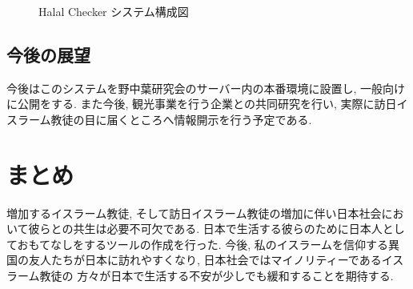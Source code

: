 \begin{figure}[htbp]
    \begin{center}
    \end{center}
    \caption{Halal Checker システム構成図}
    \label{fig:halal_checker_system}
\end{figure}

\subsection{今後の展望}
今後はこのシステムを野中葉研究会のサーバー内の本番環境に設置し, 一般向けに公開をする.
また今後, 観光事業を行う企業との共同研究を行い, 実際に訪日イスラーム教徒の目に届くところへ情報開示を行う予定である.

\section{まとめ}
増加するイスラーム教徒, そして訪日イスラーム教徒の増加に伴い日本社会において彼らとの共生は必要不可欠である.
日本で生活する彼らのために日本人としておもてなしをするツールの作成を行った.
今後, 私のイスラームを信仰する異国の友人たちが日本に訪れやすくなり, 日本社会ではマイノリティーであるイスラーム教徒の
方々が日本で生活する不安が少しでも緩和することを期待する.


